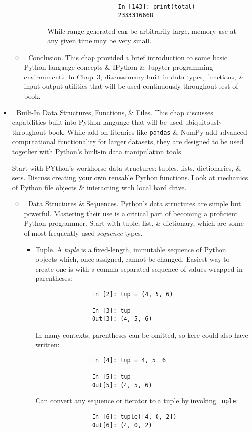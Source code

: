 \documentclass{article}
\begin{document}
\begin{itemize}
\begin{itemize}
\begin{itemize}
\begin{itemize}
\begin{verbatim}
					In [143]: print(total)
					2333316668
				\end{verbatim}
				While range generated can be arbitrarily large, memory use at any given time may be very small.
			\end{itemize}
		\end{itemize}
		\item {. Conclusion.} This chap provided a brief introduction to some basic Python language concepts \& IPython \& Jupyter programming environments. In Chap. 3, discuss many built-in data types, functions, \& input-output utilities that will be used continuously throughout rest of book.
	\end{itemize}
	\item {. Built-In Data Structures, Functions, \& Files.} This chap discusses capabilities built into Python language that will be used ubiquitously throughout book. While add-on libraries like {\tt pandas} \& NumPy add advanced computational functionality for larger datasets, they are designed to be used together with Python's built-in data manipulation tools.
	
	Start with PYthon's workhorse data structures: tuples, lists, dictionaries, \& sets. Discuss creating your own reusable Python functions. Look at mechanics of Python file objects \& interacting with local hard drive.
	\begin{itemize}
		\item {. Data Structures \& Sequences.} Python's data structures are simple but powerful. Mastering their use is a critical part of becoming a proficient Python programmer. Start with tuple, list, \& dictionary, which are some of most frequently used {\it sequence} types.
		\begin{itemize}
			\item {\sf Tuple.} A {\it tuple} is a fixed-length, immutable sequence of Python objects which, once assigned, cannot be changed. Easiest way to create one is with a comma-separated sequence of values wrapped in parentheses:
			\begin{verbatim}
				In [2]: tup = (4, 5, 6)
				
				In [3]: tup
				Out[3]: (4, 5, 6)
			\end{verbatim}
			In many contexts, parentheses can be omitted, so here could also have written:
			\begin{verbatim}
				In [4]: tup = 4, 5, 6
				
				In [5]: tup
				Out[5]: (4, 5, 6)
			\end{verbatim}
			Can convert any sequence or iterator to a tuple by invoking {\tt tuple}:
			\begin{verbatim}
				In [6]: tuple([4, 0, 2])
				Out[6]: (4, 0, 2)
				

\end{verbatim}
\end{itemize}
\end{itemize}
\end{itemize}
\end{document}
